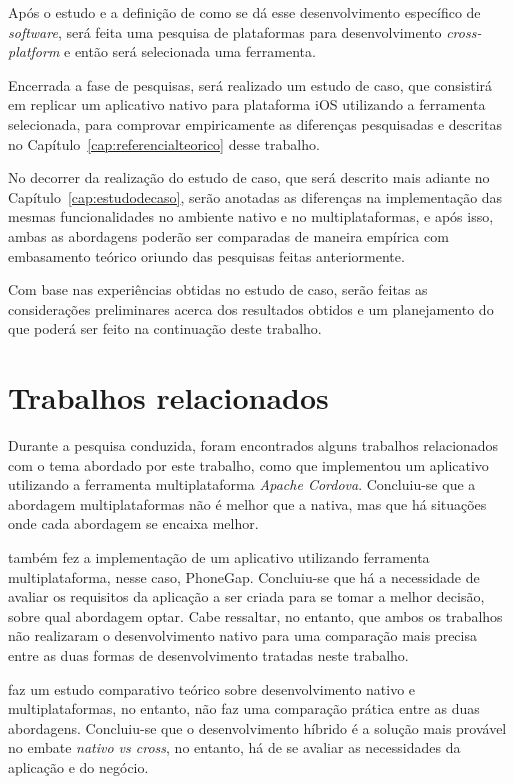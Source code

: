 Após o estudo e a definição de como se dá esse desenvolvimento específico de \textit{software},
será feita uma pesquisa de plataformas para desenvolvimento \textit{cross-platform} e então será selecionada uma ferramenta. 

Encerrada a fase de pesquisas, será realizado um estudo de caso, que consistirá em replicar um aplicativo nativo para plataforma iOS utilizando a ferramenta selecionada, 
para comprovar empiricamente as diferenças pesquisadas e descritas no Capítulo~\ref{cap:referencialteorico} desse trabalho.

No decorrer da realização do estudo de caso, que será descrito mais adiante no 
Capítulo~\ref{cap:estudodecaso}, serão anotadas as diferenças na implementação das mesmas funcionalidades no ambiente nativo e no multiplataformas, e após isso, ambas as abordagens poderão ser comparadas
de maneira empírica com embasamento teórico oriundo das pesquisas feitas anteriormente.

Com base nas experiências obtidas no estudo de caso, serão feitas as considerações preliminares acerca dos resultados obtidos e um planejamento do que poderá ser feito na continuação deste trabalho.

\section{Trabalhos relacionados} \label{sec:trabalhosrelacionados}

Durante a pesquisa conduzida, foram encontrados alguns trabalhos relacionados com o tema abordado por este trabalho, como 
que implementou um aplicativo utilizando a ferramenta multiplataforma \textit{Apache Cordova}. Concluiu-se que a abordagem multiplataformas 
não é melhor que a nativa, mas que há situações onde cada abordagem se encaixa melhor.

 também fez a implementação de um aplicativo utilizando ferramenta multiplataforma, nesse caso, PhoneGap. 
Concluiu-se que há a necessidade de avaliar os requisitos da aplicação a ser criada para se tomar a melhor decisão, sobre qual abordagem optar.
Cabe ressaltar, no entanto, que ambos os trabalhos não realizaram o desenvolvimento nativo para uma comparação mais precisa entre as duas formas de desenvolvimento
tratadas neste trabalho. 

 faz um estudo comparativo teórico sobre desenvolvimento nativo e multiplataformas, no entanto,
não faz uma comparação prática entre as duas abordagens. Concluiu-se que o desenvolvimento híbrido é a solução mais provável no embate 
\textit{nativo vs cross}, no entanto, há de se avaliar as necessidades da aplicação e do negócio.


